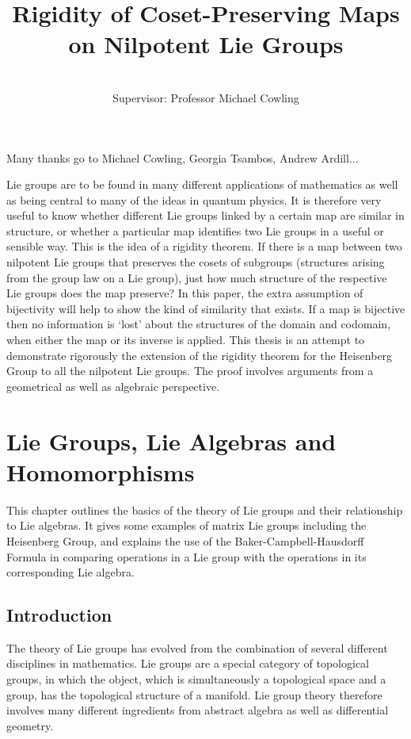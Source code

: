\documentclass[honours]{UNSWthesis}
\title{Rigidity of Coset-Preserving Maps on Nilpotent Lie Groups}
\author{\Authornameonly\\{\bigskip}Supervisor: Professor Michael Cowling}
\newcommand{\1}{\mathbf{e}_{1}}
\newcommand{\2}{\mathbf{e}_{3}}
\newcommand{\3}{\mathbf{e}_{3}}
\begin{document}
\maketitle

{\noindent}Many thanks go to Michael Cowling, Georgia Tsambos, Andrew Ardill...


Lie groups are to be found in many different applications of mathematics as well as being central to many of the ideas in quantum physics. It is therefore very useful to know whether different Lie groups linked by a certain map are similar in structure, or whether a particular map identifies two Lie groups in a useful or sensible way. This is the idea of a rigidity theorem. If there is a map between two nilpotent Lie groups that preserves the cosets of subgroups (structures arising from the group law on a Lie group), just how much structure of the respective Lie groups does the map preserve? In this paper, the extra assumption of bijectivity will help to show the kind of similarity that exists. If a map is bijective then no information is `lost' about the structures of the domain and codomain, when either the map or its inverse is applied. 
This thesis is an attempt to demonstrate rigorously the extension of the rigidity theorem for the Heisenberg Group to all the nilpotent Lie groups. The proof involves arguments from a geometrical as well as algebraic perspective. 


\chapter{Lie Groups, Lie Algebras and Homomorphisms}
This chapter outlines the basics of the theory of Lie groups and their relationship to Lie algebras. It gives some examples of matrix Lie groups including the Heisenberg Group, and explains the use of the Baker-Campbell-Hausdorff Formula in comparing operations in a Lie group with the operations in its corresponding Lie algebra. 

\section{Introduction}
The theory of Lie groups has evolved from the combination of several different disciplines in mathematics. Lie groups are a special category of topological groups, in which the object, which is simultaneously a topological space and a group, has the topological structure of a manifold. Lie group theory therefore involves many different ingredients from abstract algebra as well as differential geometry. 
\end{document}
